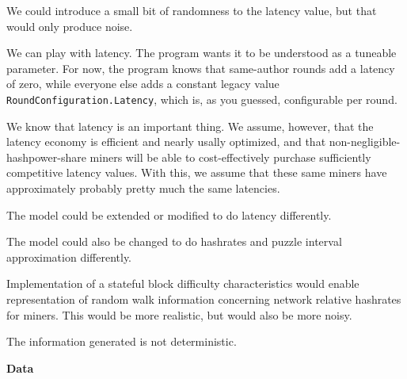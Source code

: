 \documentclass[11pt]{article}
\theoremstyle{plain}
\begin{document}
%

We could introduce a small bit of randomness to the latency value, but that
would only produce noise.

We can play with latency. The program wants it to be understood as a tuneable
parameter. For now, the program knows that same-author rounds add a latency of
zero, while everyone else adds a constant legacy value
\texttt{RoundConfiguration.Latency}, which is, as you guessed, configurable per 
round.

We know that latency is an important thing.
We assume, however, that the latency economy is efficient and nearly usally 
optimized,
and that non-negligible-hashpower-share miners will be able to cost-effectively
purchase sufficiently competitive latency values. With this, we assume that
these same miners have approximately probably pretty much the same latencies.

The model could be extended or modified to do latency differently.

The model could also be changed to do hashrates and puzzle interval
approximation differently.

Implementation of a stateful block difficulty characteristics would enable
representation of random walk information concerning network relative hashrates
for miners. This would be more realistic, but would also be more noisy.



The information generated is not deterministic.

\textbf{Data}
\end{document}
